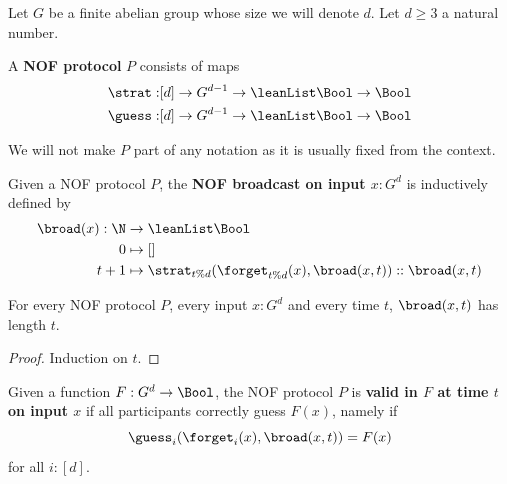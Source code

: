 Let $G$ be a finite abelian group whose size we will denote $d$. Let $d \ge 3$ a natural number.

\begin{definition}
  \label{def:protocol}
  \leanok

  A {\bf NOF protocol} $P$ consists of maps
  \begin{align}
    \strat : & [d] \to G^{d - 1} \to \leanList \Bool \to \Bool \\
    \guess : & [d] \to G^{d - 1} \to \leanList \Bool \to \Bool
  \end{align}
\end{definition}

We will not make $P$ part of any notation as it is usually fixed from the context.

\begin{definition}
  \label{def:broadcast}
  \leanok

  Given a NOF protocol $P$, the {\bf NOF broadcast on input $x : G^d$} is inductively defined by
  \begin{align}
    \broad(x) : \N & \to \leanList \Bool \\
    0 & \mapsto [] \\
    t + 1 & \mapsto \strat_{t \% d}(\forget_{t \% d}(x), \broad(x, t)) :: \broad(x, t)
  \end{align}
\end{definition}

\begin{lemma}
  \label{lem:length-broadcast}
  \leanok
  For every NOF protocol $P$, every input $x : G^d$ and every time $t$, $\broad(x, t)$ has length $t$.
\end{lemma}
\begin{proof}
  \uses{}
  \leanok
  Induction on $t$.
\end{proof}

\begin{definition}
  \label{def:valid-protocol}
  \leanok

  Given a function $F : G^d \to \Bool$, the NOF protocol $P$ is {\bf valid in $F$ at time $t$ on input $x$} if all participants correctly guess $F(x)$, namely if
  $$\guess_i(\forget_i(x), \broad(x, t)) = F(x)$$
  for all $i : [d]$.
\end{definition}

